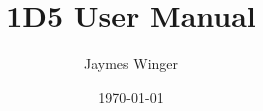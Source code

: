 \documentclass[12pt,twoside,letterpaper,openany,draft]{book}
\begin{document}
\title{1D5 User Manual}
\author{Jaymes Winger}
\date{\today}
\frontmatter
\maketitle

\tableofcontents



\mainmatter




\appendix



\backmatter



\end{document}
